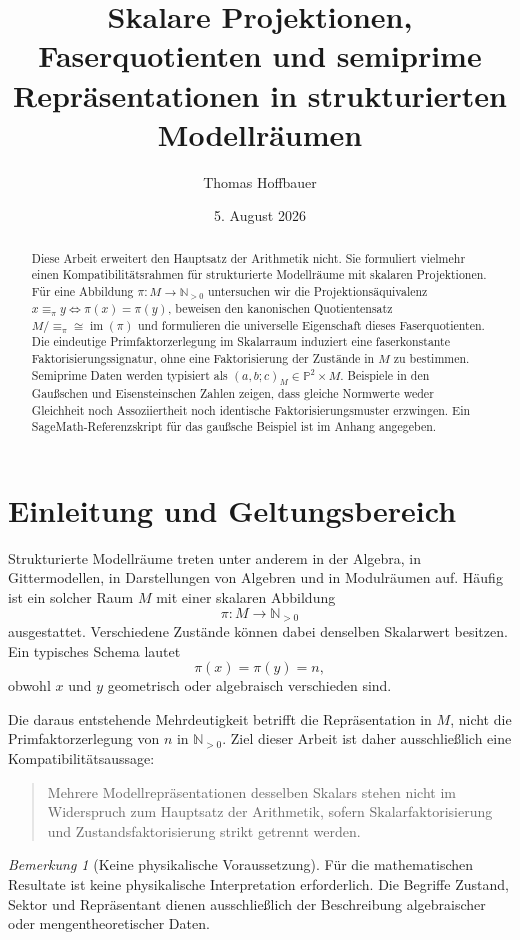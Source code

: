 \documentclass[11pt,a4paper,reqno]{amsart}
\title[Skalare Projektionen und Faserquotienten]{Skalare Projektionen, Faserquotienten und semiprime Repräsentationen in strukturierten Modellräumen}
\author{Thomas Hoffbauer}
\date{5. August 2026}
\theoremstyle{definition}
\theoremstyle{remark}
\newtheorem{remark}[theorem]{Bemerkung}
\newcommand{\Npos}{\mathbb{N}_{>0}}
\newcommand{\Pset}{\mathbb{P}}
\newcommand{\im}{\operatorname{im}}
\newcommand{\eqpi}{\mathrel{\equiv_{\pi}}}
\begin{document}
\begin{abstract}
Diese Arbeit erweitert den Hauptsatz der Arithmetik nicht. Sie formuliert vielmehr einen Kompatibilitätsrahmen für strukturierte Modellräume mit skalaren Projektionen. Für eine Abbildung $\pi\colon M\to\Npos$ untersuchen wir die Projektionsäquivalenz
$x\eqpi y\iff\pi(x)=\pi(y)$, beweisen den kanonischen Quotientensatz
$M/{\equiv_\pi}\cong\im(\pi)$ und formulieren die universelle Eigenschaft dieses Faserquotienten. Die eindeutige Primfaktorzerlegung im Skalarraum induziert eine faserkonstante Faktorisierungssignatur, ohne eine Faktorisierung der Zustände in $M$ zu bestimmen. Semiprime Daten werden typisiert als $(a,b;c)_M\in\Pset^2\times M$. Beispiele in den Gaußschen und Eisensteinschen Zahlen zeigen, dass gleiche Normwerte weder Gleichheit noch Assoziiertheit noch identische Faktorisierungsmuster erzwingen. Ein SageMath-Referenzskript für das gaußsche Beispiel ist im Anhang angegeben.
\end{abstract}

\maketitle

\section{Einleitung und Geltungsbereich}

Strukturierte Modellräume treten unter anderem in der Algebra, in Gittermodellen, in Darstellungen von Algebren und in Modulräumen auf. Häufig ist ein solcher Raum $M$ mit einer skalaren Abbildung
\[
  \pi\colon M\longrightarrow\Npos
\]
ausgestattet. Verschiedene Zustände können dabei denselben Skalarwert besitzen. Ein typisches Schema lautet
\[
  \pi(x)=\pi(y)=n,
\]
obwohl $x$ und $y$ geometrisch oder algebraisch verschieden sind.

Die daraus entstehende Mehrdeutigkeit betrifft die Repräsentation in $M$, nicht die Primfaktorzerlegung von $n$ in $\Npos$. Ziel dieser Arbeit ist daher ausschließlich eine Kompatibilitätsaussage:

\begin{quote}
Mehrere Modellrepräsentationen desselben Skalars stehen nicht im Widerspruch zum Hauptsatz der Arithmetik, sofern Skalarfaktorisierung und Zustandsfaktorisierung strikt getrennt werden.
\end{quote}

\begin{remark}[Keine physikalische Voraussetzung]
Für die mathematischen Resultate ist keine physikalische Interpretation erforderlich. Die Begriffe Zustand, Sektor und Repräsentant dienen ausschließlich der Beschreibung algebraischer oder mengentheoretischer Daten.
\end{remark}
\end{document}
